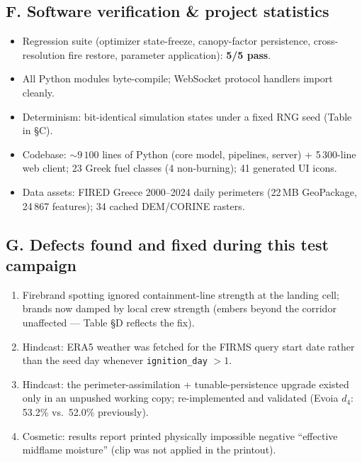 \documentclass[11pt]{article}
\begin{document}
\subsection*{F. Software verification \& project statistics}

\begin{itemize}
  \item Regression suite (optimizer state-freeze, canopy-factor
        persistence, cross-resolution fire restore, parameter
        application): \textbf{5/5 pass}.
  \item All Python modules byte-compile; WebSocket protocol handlers
        import cleanly.
  \item Determinism: bit-identical simulation states under a fixed RNG
        seed (Table in \S C).
  \item Codebase: ${\sim}9\,100$ lines of Python (core model, pipelines,
        server) + 5\,300-line web client; 23 Greek fuel classes (4
        non-burning); 41 generated UI icons.
  \item Data assets: FIRED Greece 2000--2024 daily perimeters (22\,MB
        GeoPackage, 24\,867 features); 34 cached DEM/CORINE rasters.
\end{itemize}

\subsection*{G. Defects found and fixed during this test campaign}

\begin{enumerate}
  \item Firebrand spotting ignored containment-line strength at the
        landing cell; brands now damped by local crew strength (embers
        beyond the corridor unaffected --- Table \S D reflects the fix).
  \item Hindcast: ERA5 weather was fetched for the FIRMS query start date
        rather than the seed day whenever \texttt{ignition\_day} $>1$.
  \item Hindcast: the perimeter-assimilation + tunable-persistence
        upgrade existed only in an unpushed working copy; re-implemented
        and validated (Evoia $d_4$: 53.2\% vs.\ 52.0\% previously).
  \item Cosmetic: results report printed physically impossible negative
        ``effective midflame moisture'' (clip was not applied in the
        printout).
\end{enumerate}
\end{document}
